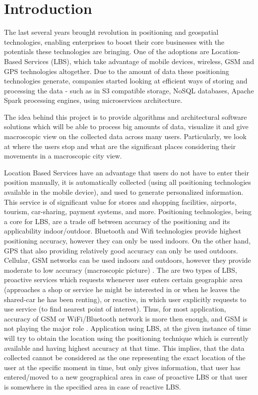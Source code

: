 \chapter{Introduction}

The last several years brought revolution in positioning and geospatial technologies, enabling enterprises to boost their core businesses with the potentials these technologies are bringing. One of the adoptions are Location-Based Services (LBS), which take advantage of mobile devices, wireless, GSM and GPS technologies altogether. Due to the amount of data these positioning technologies generate, companies started looking at efficient ways of storing and processing the data - such as in S3 compatible storage, NoSQL databases, Apache Spark processing engines, using microservices architecture.

The idea behind this project is to provide algorithms and architectural software solutions which will be able to process big amounts of data, visualize it and give macroscopic view on the collected data across many users. Particularly, we look at where the users stop and what are the significant places considering their movements in a macroscopic city view. 

Location Based Services have an advantage that users do not have to enter their position manually, it is automatically collected (using all positioning technologies available in the mobile device), and used to generate personalized information. This service is of significant value for stores and shopping facilities, airports, tourism, car-sharing, payment systems, and more. Positioning technologies, being a core for LBS, are a trade off between accuracy of the positioning and its applicability indoor/outdoor. Bluetooth and Wifi technologies provide highest positioning accuracy, however they can only be used indoors. On the other hand, GPS that also providing relatively good accuracy can only be used outdoors. Cellular, GSM networks can be used indoors and outdoors, however they provide moderate to low accuracy (macroscopic picture) \cite{LocPos1}. The are two types of LBS, proactive services which requests whenever user enters certain geographic area (approaches a shop or service he might be interested in or when he leaves the shared-car he has been renting), or reactive, in which user explicitly requests to use service (to find nearest point of interest). Thus, for most application, accuracy of GSM or WiFi/Bluetooth network is more then enough, and GSM is not playing the major role \cite{LocPos2}. Application using LBS, at the given instance of time will try to obtain the location using the positioning technique which is currently available and having highest accuracy at that time. This implies, that the data collected cannot be considered as the one representing the exact location of the user at the specific moment in time, but only gives information, that user has entered/moved to a new geographical area in case of proactive LBS or that user is somewhere in the specified area in case of reactive LBS. 